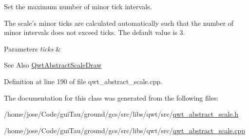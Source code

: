 Set the maximum number of minor tick intervals. 

The scale's minor ticks are calculated automatically such that the number of minor intervals does not exceed ticks. The default value is 3. 
\begin{DoxyParams}{Parameters}
{\em ticks} & \\
\hline
\end{DoxyParams}
\begin{DoxySeeAlso}{See Also}
\hyperlink{class_qwt_abstract_scale_draw}{Qwt\-Abstract\-Scale\-Draw} 
\end{DoxySeeAlso}


Definition at line 190 of file qwt\-\_\-abstract\-\_\-scale.\-cpp.



The documentation for this class was generated from the following files\-:\begin{DoxyCompactItemize}
\item 
/home/jose/\-Code/gui\-Tau/ground/gcs/src/libs/qwt/src/\hyperlink{qwt__abstract__scale_8h}{qwt\-\_\-abstract\-\_\-scale.\-h}\item 
/home/jose/\-Code/gui\-Tau/ground/gcs/src/libs/qwt/src/\hyperlink{qwt__abstract__scale_8cpp}{qwt\-\_\-abstract\-\_\-scale.\-cpp}\end{DoxyCompactItemize}
